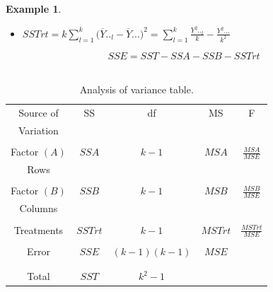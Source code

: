 \documentclass[11pt,a4paper]{article}
\theoremstyle{definition}
\newtheorem{exa}[thm]{Example}
\begin{document}
\begin{exa}
\begin{itemize}
\item[] $SSTrt = \displaystyle{k\sum^k_{l=1}\big(\overline{Y}.._l-\overline{Y}...\big)^2=\sum^k_{l=1}\frac{Y^2.._l}{k}-\frac{Y^2...}{k^2}}$\\
\end{itemize}

$$SSE = SST - SSA - SSB - SSTrt$$\\


\begin{table}[H]
\centering
\begin{tabular}{|c|c|c|c|c|}
\hline
Source of & SS & df & MS & F\\
Variation & & & &\\
\hline
&&&&\\
Factor $(A)$ & $SSA$ & $k-1$ & $MSA$ & $\frac{MSA}{MSE}$\\
Rows &&&&\\
&&&&\\
Factor $(B)$ & $SSB$ & $k-1$ & $MSB$ & $\frac{MSB}{MSE}$\\
Columns &&&&\\
&&&&\\
Treatments & $SSTrt$ & $k-1$ & $MSTrt$ & $\frac{MSTrt}{MSE}$\\
&&&&\\
Error & $SSE$ & $(k-1)(k-1)$ & $MSE$ &\\
&&&&\\
\hline
&&&&\\
Total & $SST$ & $k^2-1$ &&\\
\hline
\end{tabular}
\caption{Analysis of variance table.}
\end{table}


\end{exa}
\end{document}
